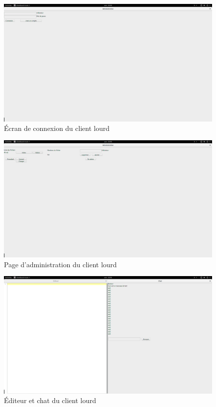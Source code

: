\documentclass[a4paper, 12pt]{article}
\begin{document}
\begin{figure}[H]
  \begin{center}
    \includegraphics[scale=0.2]{client_lourd.png}
  \end{center}
  \caption{Écran de connexion du client lourd}
\end{figure}

\begin{figure}[H]
  \begin{center}
    \includegraphics[scale=0.2]{admin_lourd}
  \end{center}
  \caption{Page d'administration du client lourd}
\end{figure}

\begin{figure}[H]
  \begin{center}
    \includegraphics[scale=0.2]{editeur_lourd.png}
  \end{center}
  \caption{Éditeur et chat du client lourd}
\end{figure}
\end{document}
